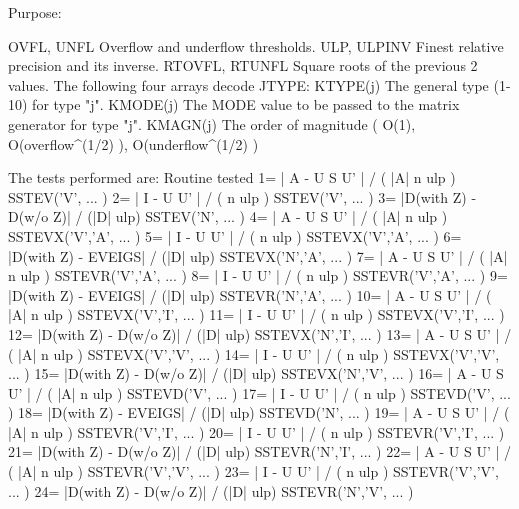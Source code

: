 \begin{DoxyParagraph}{Purpose\+: }
\begin{DoxyVerb}
       OVFL, UNFL      Overflow and underflow thresholds.
       ULP, ULPINV     Finest relative precision and its inverse.
       RTOVFL, RTUNFL  Square roots of the previous 2 values.
               The following four arrays decode JTYPE:
       KTYPE(j)        The general type (1-10) for type "j".
       KMODE(j)        The MODE value to be passed to the matrix
                       generator for type "j".
       KMAGN(j)        The order of magnitude ( O(1),
                       O(overflow^(1/2) ), O(underflow^(1/2) )

     The tests performed are:                 Routine tested
    1= | A - U S U' | / ( |A| n ulp )         SSTEV('V', ... )
    2= | I - U U' | / ( n ulp )               SSTEV('V', ... )
    3= |D(with Z) - D(w/o Z)| / (|D| ulp)     SSTEV('N', ... )
    4= | A - U S U' | / ( |A| n ulp )         SSTEVX('V','A', ... )
    5= | I - U U' | / ( n ulp )               SSTEVX('V','A', ... )
    6= |D(with Z) - EVEIGS| / (|D| ulp)       SSTEVX('N','A', ... )
    7= | A - U S U' | / ( |A| n ulp )         SSTEVR('V','A', ... )
    8= | I - U U' | / ( n ulp )               SSTEVR('V','A', ... )
    9= |D(with Z) - EVEIGS| / (|D| ulp)       SSTEVR('N','A', ... )
    10= | A - U S U' | / ( |A| n ulp )        SSTEVX('V','I', ... )
    11= | I - U U' | / ( n ulp )              SSTEVX('V','I', ... )
    12= |D(with Z) - D(w/o Z)| / (|D| ulp)    SSTEVX('N','I', ... )
    13= | A - U S U' | / ( |A| n ulp )        SSTEVX('V','V', ... )
    14= | I - U U' | / ( n ulp )              SSTEVX('V','V', ... )
    15= |D(with Z) - D(w/o Z)| / (|D| ulp)    SSTEVX('N','V', ... )
    16= | A - U S U' | / ( |A| n ulp )        SSTEVD('V', ... )
    17= | I - U U' | / ( n ulp )              SSTEVD('V', ... )
    18= |D(with Z) - EVEIGS| / (|D| ulp)      SSTEVD('N', ... )
    19= | A - U S U' | / ( |A| n ulp )        SSTEVR('V','I', ... )
    20= | I - U U' | / ( n ulp )              SSTEVR('V','I', ... )
    21= |D(with Z) - D(w/o Z)| / (|D| ulp)    SSTEVR('N','I', ... )
    22= | A - U S U' | / ( |A| n ulp )        SSTEVR('V','V', ... )
    23= | I - U U' | / ( n ulp )              SSTEVR('V','V', ... )
    24= |D(with Z) - D(w/o Z)| / (|D| ulp)    SSTEVR('N','V', ... )


\end{DoxyVerb}
\end{DoxyParagraph}
